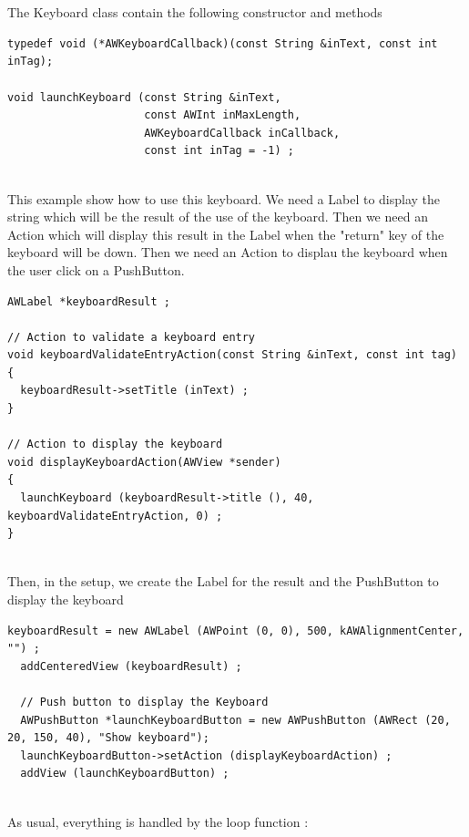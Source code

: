 \documentclass[a4paper,11pt]{extarticle}
\begin{document}
~\\

~\\ The Keyboard class contain the following constructor and methods

\begin{lstlisting}[language=Arduinonl]
typedef void (*AWKeyboardCallback)(const String &inText, const int inTag);

void launchKeyboard (const String &inText,
                     const AWInt inMaxLength,
                     AWKeyboardCallback inCallback,
                     const int inTag = -1) ;
\end{lstlisting}

~\\ This example show how to use this keyboard. We need a Label to display the string which will be the result of the use of the keyboard. Then we need an Action which will display this result in the Label when the "return" key of the keyboard will be down. Then we need an Action to displau the keyboard when the user click on a PushButton.

\begin{lstlisting}[language=Arduinonl]
AWLabel *keyboardResult ;

// Action to validate a keyboard entry
void keyboardValidateEntryAction(const String &inText, const int tag)
{
  keyboardResult->setTitle (inText) ;
}

// Action to display the keyboard
void displayKeyboardAction(AWView *sender)
{
  launchKeyboard (keyboardResult->title (), 40, keyboardValidateEntryAction, 0) ;
}

\end{lstlisting}

~\\ Then, in the setup, we create the Label for the result and the PushButton to display the keyboard

\begin{lstlisting}[language=Arduinonl]
  keyboardResult = new AWLabel (AWPoint (0, 0), 500, kAWAlignmentCenter, "") ;
  addCenteredView (keyboardResult) ;
  
  // Push button to display the Keyboard
  AWPushButton *launchKeyboardButton = new AWPushButton (AWRect (20, 20, 150, 40), "Show keyboard");
  launchKeyboardButton->setAction (displayKeyboardAction) ;
  addView (launchKeyboardButton) ;
\end{lstlisting}

~\\ As usual, everything is handled by the loop function :
\end{document}
